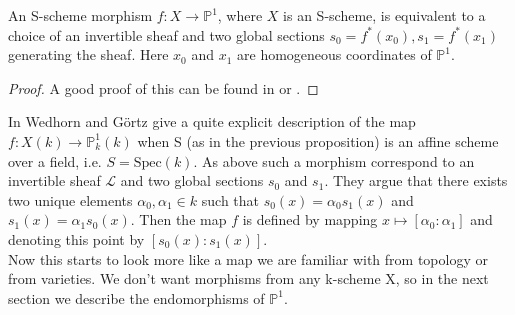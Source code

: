 \begin{proposition}
An S-scheme morphism \(f: X \to \mathbb{P}^1\), where \(X\) is an S-scheme, is equivalent to a choice of an invertible sheaf and two global sections \(s_0 = f^*(x_0), s_1 = f^*(x_1)\) generating the sheaf. Here \(x_0\) and \(x_1\) are homogeneous coordinates of \(\mathbb{P}^1\). 
%
\begin{proof}
A good proof of this can be found in \cite[Thm 7.1]{hartshorne} or \cite[Cor 13.33]{Wedhorn-Gortz}. 
\end{proof}
\end{proposition}
%
In \cite[Remark 13.34]{Wedhorn-Gortz} Wedhorn and Görtz give a quite explicit description of the map \(f: X(k) \to \mathbb{P}_k^1(k)\) when S (as in the previous proposition) is an affine scheme over a field, i.e. \(S = \text{Spec}(k)\). As above such a morphism correspond to an invertible sheaf \(\mathcal{L}\) and two global sections \(s_0\) and \(s_1\). They argue that there exists two unique elements \(\alpha_0 , \alpha_1 \in k\) such that \(s_0(x) = \alpha_0 s_1(x)\) and \(s_1(x) = \alpha_1 s_0(x)\). Then the map \(f\) is defined by mapping \(x \mapsto [\alpha_0 : \alpha_1]\) and denoting this point by \([s_0(x) : s_1(x)]\). \\
Now this starts to look more like a map we are familiar with from topology or from varieties. We don't want morphisms from any k-scheme X, so in the next section we describe the endomorphisms of \(\mathbb{P}^1\). 
%

